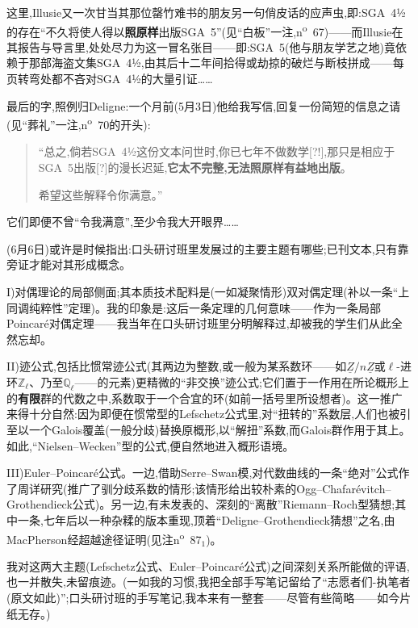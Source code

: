 这里,Illusie又一次甘当其那位罄竹难书的朋友另一句俏皮话的应声虫,即:SGA~4½的存在“不久将使人得以\textbf{照原样}出版SGA~5”(见“白板”一注,n\textsuperscript{o}~67)——而Illusie在其报告与导言里,处处尽力为这一冒名张目——即:SGA~5(他与朋友学艺之地)竟依赖于那部海盗文集SGA~4½,由其后十二年间拾得或劫掠的破烂与断枝拼成——每页转弯处都不吝对SGA~4½的大量引证……

最后的字,照例归Deligne:一个月前(5月3日)他给我写信,回复一份简短的信息之请(见“葬礼”一注,n\textsuperscript{o}~70的开头):

\begin{quote}
“总之,倘若SGA~4½这份文本问世时,你已七年不做数学[?!],那只是相应于SGA~5出版[?]的漫长迟延,\textbf{它太不完整,无法照原样有益地出版}。

希望这些解释令你满意。”
\end{quote}

它们即便不曾“令我满意”,至少令我大开眼界……


(6月6日)或许是时候指出:口头研讨班里发展过的主要主题有哪些;已刊文本,只有靠旁证才能对其形成概念。

I)对偶理论的局部侧面;其本质技术配料是(一如凝聚情形)双对偶定理(补以一条“上同调纯粹性”定理)。我的印象是:这后一条定理的几何意味——作为一条局部Poincaré对偶定理——我当年在口头研讨班里分明解释过,却被我的学生们从此全然忘却。

II)迹公式,包括比惯常迹公式(其两边为整数,或一般为某系数环——如$\underline{Z}/n\underline{Z}$或$\ell$-进环$\mathbb{Z}_\ell$、乃至$\mathbb{Q}_\ell$——的元素)更精微的“非交换”迹公式;它们置于一作用在所论概形上的\textbf{有限}群的代数之中,系数取于一个合宜的环(如前一括号里所设想者)。这一推广来得十分自然:因为即便在惯常型的Lefschetz公式里,对“扭转的”系数层,人们也被引至以一个Galois覆盖(一般分歧)替换原概形,以“解扭”系数,而Galois群作用于其上。如此,“Nielsen--Wecken”型的公式,便自然地进入概形语境。

III)Euler--Poincaré公式。一边,借助Serre--Swan模,对代数曲线的一条“绝对”公式作了周详研究(推广了驯分歧系数的情形;该情形给出较朴素的Ogg--Chafarévitch--Grothendieck公式)。另一边,有未发表的、深刻的“离散”Riemann--Roch型猜想;其中一条,七年后以一种杂糅的版本重现,顶着“Deligne--Grothendieck猜想”之名,由MacPherson经超越途径证明(见注n\textsuperscript{o}~87$_{1}$)。

我对这两大主题(Lefschetz公式、Euler--Poincaré公式)之间深刻关系所能做的评语,也一并散失,未留痕迹。(一如我的习惯,我把全部手写笔记留给了“志愿者们-执笔者(原文如此)”;口头研讨班的手写笔记,我本来有一整套——尽管有些简略——如今片纸无存。)


